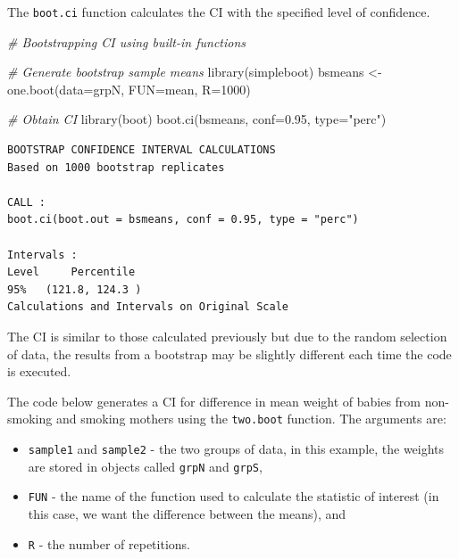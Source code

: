 \documentclass[
  oneside]{krantz}
\newenvironment{Shaded}{\begin{snugshade}}{\end{snugshade}}
\newcommand{\AttributeTok}[1]{\textcolor[rgb]{0.77,0.63,0.00}{#1}}
\newcommand{\CommentTok}[1]{\textcolor[rgb]{0.56,0.35,0.01}{\textit{#1}}}
\newcommand{\DecValTok}[1]{\textcolor[rgb]{0.00,0.00,0.81}{#1}}
\newcommand{\FloatTok}[1]{\textcolor[rgb]{0.00,0.00,0.81}{#1}}
\newcommand{\FunctionTok}[1]{\textcolor[rgb]{0.00,0.00,0.00}{#1}}
\newcommand{\NormalTok}[1]{#1}
\newcommand{\OtherTok}[1]{\textcolor[rgb]{0.56,0.35,0.01}{#1}}
\newcommand{\StringTok}[1]{\textcolor[rgb]{0.31,0.60,0.02}{#1}}
\providecommand{\tightlist}{%
  \setlength{\itemsep}{0pt}\setlength{\parskip}{0pt}}
\begin{document}
The \texttt{boot.ci} function calculates the CI with the specified level of confidence.

\begin{Shaded}
\begin{Highlighting}[]
\CommentTok{\# Bootstrapping CI using built{-}in functions}

\CommentTok{\# Generate bootstrap sample means}
\FunctionTok{library}\NormalTok{(simpleboot)}
\NormalTok{bsmeans }\OtherTok{\textless{}{-}} \FunctionTok{one.boot}\NormalTok{(}\AttributeTok{data=}\NormalTok{grpN, }\AttributeTok{FUN=}\NormalTok{mean, }\AttributeTok{R=}\DecValTok{1000}\NormalTok{)}

\CommentTok{\# Obtain CI}
\FunctionTok{library}\NormalTok{(boot)}
\FunctionTok{boot.ci}\NormalTok{(bsmeans, }\AttributeTok{conf=}\FloatTok{0.95}\NormalTok{, }\AttributeTok{type=}\StringTok{"perc"}\NormalTok{) }
\end{Highlighting}
\end{Shaded}

\begin{verbatim}
BOOTSTRAP CONFIDENCE INTERVAL CALCULATIONS
Based on 1000 bootstrap replicates

CALL : 
boot.ci(boot.out = bsmeans, conf = 0.95, type = "perc")

Intervals : 
Level     Percentile     
95%   (121.8, 124.3 )  
Calculations and Intervals on Original Scale
\end{verbatim}

The CI is similar to those calculated previously but due to the random selection of data, the results from a bootstrap may be slightly different each time the code is executed.

The code below generates a CI for difference in mean weight of babies from non-smoking and smoking mothers using the \texttt{two.boot} function. The arguments are:

\begin{itemize}
\tightlist
\item
  \texttt{sample1} and \texttt{sample2} - the two groups of data, in this example, the weights are stored in objects called \texttt{grpN} and \texttt{grpS},
\item
  \texttt{FUN} - the name of the function used to calculate the statistic of interest (in this case, we want the difference between the means), and
\item
  \texttt{R} - the number of repetitions.
\end{itemize}
\end{document}
